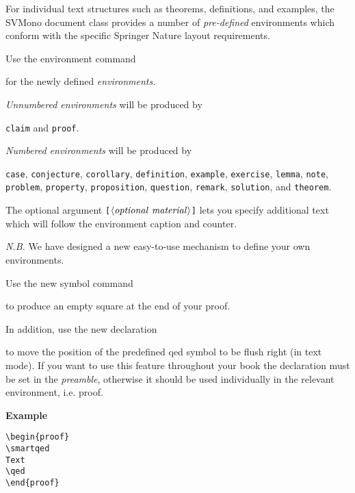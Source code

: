 \documentclass[graybox,square]{svmono}
\begin{document}
\begin{sloppy}
For individual text structures such as theorems, definitions, and examples, the {\sc SVMono} document class provides a number of {\it pre-defined} environments which conform with the specific Springer Nature layout requirements.

Use the environment command

\cprotect{}

for the newly defined {\it environments.}

{\it Unnumbered environments} will be produced by

\verb|claim| and \verb|proof|.

{\it Numbered environments} will be produced by

{\tt case}, {\tt conjecture}, {\tt corollary}, {\tt definition}, {\tt example}, {\tt exercise}, {\tt lemma}, {\tt note}, {\tt problem}, {\tt property}, {\tt proposition}, {\tt question}, {\tt remark}, {\tt solution}, and {\tt theorem}.

The optional argument \verb|[|$\langle {\it optional~material}\rangle$\verb|]| lets you specify additional text which will follow the environment caption and counter.

{\it N.B.} We have designed a new easy-to-use mechanism to define your own environments.

Use the new symbol command
\cprotect\boxtext{\verb|\qed|}

to produce an empty square at the end of your proof.

In addition, use the new declaration

\cprotect\boxtext{\verb|\smartqed|}

to move the position of the predefined qed symbol to be flush right (in text mode). If you want to use this feature throughout your book the declaration must be set in the {\it preamble}, otherwise it should be used individually in the relevant environment, i.e. proof.


{\bf Example}

\verb|\begin{proof}|\\
\verb|\smartqed|\\
\verb|Text|\\
\verb|\qed|\\
\verb|\end{proof}|


\end{sloppy}
\end{document}
